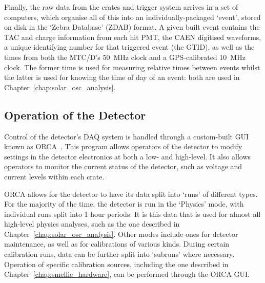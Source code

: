 Finally, the raw data from the crates and trigger system arrives in a set of computers, which organise all of this into an individually-packaged `event', stored on disk in the `Zebra Database' (ZDAB) format. A given built event contains the TAC and charge information from each hit PMT, the CAEN digitised waveforms, a unique identifying number for that triggered event (the GTID), as well as the times from both the MTC/D's \SI{50}{\MHz} clock and a GPS-calibrated \SI{10}{\MHz} clock. The former time is used for measuring relative times between events whilst the latter is used for knowing the time of day of an event: both are used in Chapter~\ref{chap:solar_osc_analysis}.


\subsection{Operation of the Detector}\label{sec:detector_ops}
Control of the detector's DAQ system is handled through a custom-built GUI known as ORCA~\cite{howeSudburyNeutrinoObservatory2004}. %
This program allows operators of the detector to modify settings in the detector electronics at both a low- and high-level. It also allows operators to monitor the current status of the detector, such as voltage and current levels within each crate.

ORCA allows for the detector to have its data split into `runs' of different types. For the majority of the time, the detector is run in the `Physics' mode, with individual runs split into 1 hour periods. It is this data that is used for almost all high-level physics analyses, such as the one described in Chapter~\ref{chap:solar_osc_analysis}. Other modes include ones for detector maintenance, as well as for calibrations of various kinds. During certain calibration runs, data can be further split into `subruns' where necessary. Operation of specific calibration sources, including the one described in Chapter~\ref{chap:smellie_hardware}, can be performed through the ORCA GUI.


